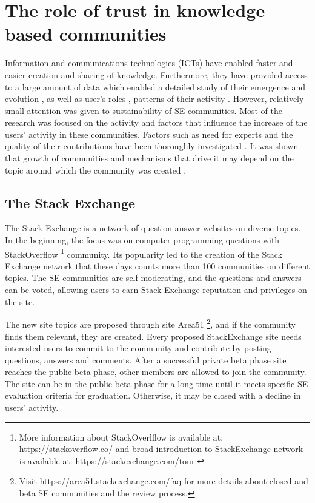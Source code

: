 
\chapter{The role of trust in knowledge based communities} %
\label{ChapterTrust}

Information and communications technologies (ICTs) have enabled faster and easier creation and sharing of knowledge. Furthermore, they have provided access to a large amount of data which enabled a detailed study of their emergence and evolution \cite{dankulov2015dynamics}, as well as user's roles \cite{saxena2021users}, patterns of their activity \cite{santos2019activity, slag2015one, chhabra2020activity}. 
However, relatively small attention was given to sustainability of SE communities. Most of the research was focused on the activity and factors that influence the increase of the users’ activity in these communities. Factors such as need for experts and the quality of their contributions have been thoroughly investigated \cite{dev2018size}. It was shown that growth of communities and mechanisms that drive it may depend on the topic around which the community was created \cite{santos2019self}. \\

\section{The Stack Exchange}

The Stack Exchange is a network of question-answer websites on diverse topics. In the beginning, the focus was on computer programming questions with StackOverflow \footnote{
	More information about StackOverlflow is available at: \url{https://stackoverflow.co/} and broad introduction to StackExchange network is available at: \url{https://stackexchange.com/tour}. 
}  community. Its popularity led to the creation of the Stack Exchange network that these days counts more than 100 communities on different topics. The SE communities are self-moderating, and the questions and answers can be voted, allowing users to earn Stack Exchange reputation and privileges on the site. 

The new site topics are proposed through site Area51 \footnote{Visit \url{https://area51.stackexchange.com/faq} for more details about closed and beta SE communities and the review process.}, and if the community finds them relevant, they are created. Every proposed  StackExchange site needs interested users to commit to the community and contribute by posting questions, answers and comments. After a successful private beta phase site reaches the public beta phase, other members are allowed to join the community. The site can be in the public beta phase for a long time until it meets specific SE evaluation criteria for graduation. Otherwise, it may be closed with a decline in users' activity. 

